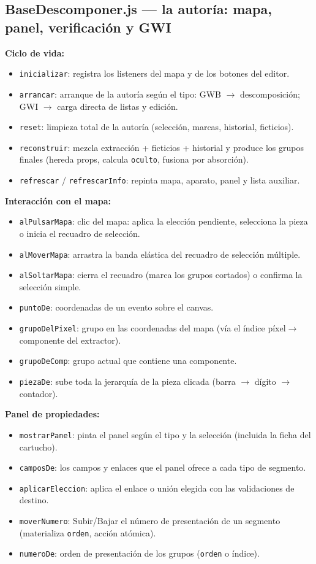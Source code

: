 \documentclass[../main.tex]{subfiles}
\begin{document}
\subsection*{BaseDescomponer.js — la autoría: mapa, panel, verificación y GWI}

\textbf{Ciclo de vida:}
\begin{itemize}
	\item \texttt{inicializar}: registra los listeners del mapa y de los
	botones del editor.
	\item \texttt{arrancar}: arranque de la autoría según el tipo:
	GWB $\rightarrow$ descomposición; GWI $\rightarrow$ carga directa de
	listas y edición.
	\item \texttt{reset}: limpieza total de la autoría (selección,
	marcas, historial, ficticios).
	\item \texttt{reconstruir}: mezcla extracción + ficticios +
	historial y produce los grupos finales (hereda props, calcula
	\texttt{oculto}, fusiona por absorción).
	\item \texttt{refrescar} / \texttt{refrescarInfo}: repinta mapa,
	aparato, panel y lista auxiliar.
\end{itemize}

\textbf{Interacción con el mapa:}
\begin{itemize}
	\item \texttt{alPulsarMapa}: clic del mapa: aplica la elección
	pendiente, selecciona la pieza o inicia el recuadro de selección.
	\item \texttt{alMoverMapa}: arrastra la banda elástica del recuadro
	de selección múltiple.
	\item \texttt{alSoltarMapa}: cierra el recuadro (marca los grupos
	cortados) o confirma la selección simple.
	\item \texttt{puntoDe}: coordenadas de un evento sobre el canvas.
	\item \texttt{grupoDelPixel}: grupo en las coordenadas del mapa
	(vía el índice píxel$\rightarrow$componente del extractor).
	\item \texttt{grupoDeComp}: grupo actual que contiene una componente.
	\item \texttt{piezaDe}: sube toda la jerarquía de la pieza clicada
	(barra $\rightarrow$ dígito $\rightarrow$ contador).
\end{itemize}

\textbf{Panel de propiedades:}
\begin{itemize}
	\item \texttt{mostrarPanel}: pinta el panel según el tipo y la
	selección (incluida la ficha del cartucho).
	\item \texttt{camposDe}: los campos y enlaces que el panel ofrece a
	cada tipo de segmento.
	\item \texttt{aplicarEleccion}: aplica el enlace o unión elegida con
	las validaciones de destino.
	\item \texttt{moverNumero}: Subir/Bajar el número de presentación de
	un segmento (materializa \texttt{orden}, acción atómica).
	\item \texttt{numeroDe}: orden de presentación de los grupos
	(\texttt{orden} o índice).
\end{itemize}
\end{document}
